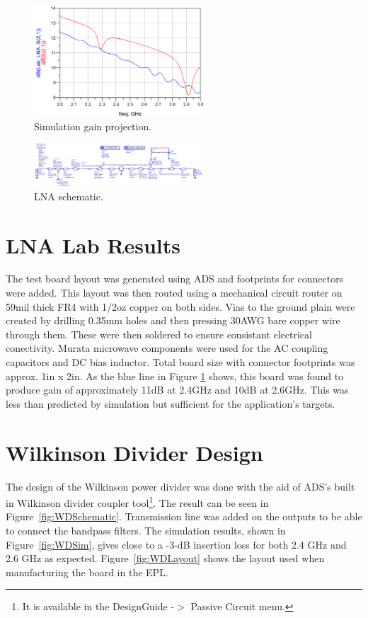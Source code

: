 \documentclass[conference]{IEEEtran}
\begin{document}
\begin{figure}[!h]
\centering
\includegraphics[width=2.5in]{amplifier_simulation_pics/lnaS21.PNG}
\caption{Simulation gain projection.}
\label{fig:LNA_sim_gain}
\end{figure}

\begin{figure}[!h]
\centering
\includegraphics[width=2.5in]{amplifier_simulation_pics/lnaSchematic.PNG}
\caption{LNA schematic.}
\label{fig:LNA_lna_schematic}
\end{figure}

\section{LNA Lab Results}
The test board layout was generated using ADS and footprints for connectors were added. This layout was then routed using a mechanical circuit router on 59mil thick FR4 with 1/2oz copper on both sides. Vias to the ground plain were created by drilling 0.35mm holes and then pressing 30AWG bare copper wire through them. These were then soldered to ensure consistant electrical conectivity. Murata microwave components were used for the AC coupling capacitors and DC bias inductor. Total board size with connector footprints was approx. 1in x 2in. As the blue line in Figure \ref{fig:LNA_sim_gain} shows, this board was  found to produce gain of approximately 11dB at 2.4GHz and 10dB at 2.6GHz. This was less than predicted by simulation but sufficient for the application's targets.


\section{Wilkinson Divider Design}
The design of the Wilkinson power divider was done with the aid of ADS's built in Wilkinson divider coupler tool\footnote{It is available in the DesignGuide -$>$ Passive Circuit menu.}.  The result can be seen in Figure~\ref{fig:WDSchematic}.  Transmission line was added on the outputs to be able to connect the bandpass filters.  The simulation results, shown in Figure~\ref{fig:WDSim}, gives close to a -3-dB insertion loss for both 2.4 GHz and 2.6 GHz as expected.  Figure~\ref{fig:WDLayout} shows the layout used when manufacturing the board in the EPL.
\end{document}

